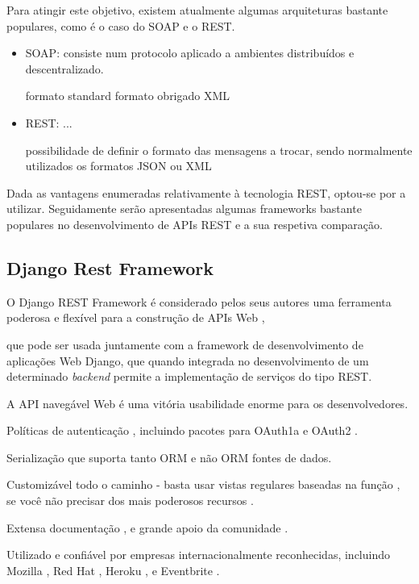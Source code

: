 Para atingir este objetivo, existem atualmente algumas arquiteturas bastante populares, como é o caso do \ac{SOAP} e o \ac{REST}. 


\begin{itemize}
	\item \ac{SOAP}: consiste num protocolo aplicado a ambientes distribuídos e descentralizado. 
	
	formato standard formato obrigado XML
	
	
	\item \ac{REST}: ...
	
	possibilidade de definir o formato das
	mensagens a trocar, sendo normalmente utilizados os formatos JSON ou XML
	
	
\end{itemize}

Dada as vantagens enumeradas relativamente à tecnologia \ac{REST}, optou-se por a utilizar. Seguidamente serão apresentadas algumas frameworks bastante populares no desenvolvimento de APIs REST e a sua respetiva comparação. 



\subsection{Django Rest Framework}


O Django REST Framework é considerado pelos seus autores uma ferramenta poderosa e flexível para a construção de APIs Web \cite{restdjango},



 que pode ser usada juntamente com a framework de desenvolvimento de aplicações Web Django, que quando integrada no desenvolvimento de um determinado \textit{backend} permite a implementação de serviços do tipo REST.



A API navegável Web é uma vitória usabilidade enorme para os desenvolvedores.

Políticas de autenticação , incluindo pacotes para OAuth1a e OAuth2 .

Serialização que suporta tanto ORM e não ORM fontes de dados.

Customizável todo o caminho - basta usar vistas regulares baseadas na função , se você não  precisar dos mais poderosos recursos .

Extensa documentação , e grande apoio da comunidade .

Utilizado e confiável por empresas internacionalmente reconhecidas, incluindo Mozilla , 
Red Hat , Heroku , e Eventbrite .






